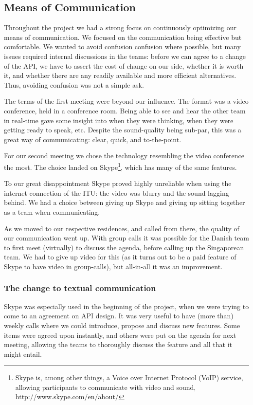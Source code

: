 \subsection{Means of Communication}

Throughout the project we had a strong focus on continuously optimizing our
means of communication. We focused on the communication being effective but
comfortable. We wanted to avoid confusion confusion where possible, but many
issues required internal discussions in the teams: before we can agree to a
change of the API, we have to assert the cost of change on our side, whether it
is worth it, and whether there are any readily available and more efficient
alternatives. Thus, avoiding confusion was not a simple ask.

The terms of the first meeting were beyond our influence. The format was a
video conference, held in a conference room. Being able to see and hear the
other team in real-time gave some insight into when they were thinking, when
they were getting ready to speak, etc. Despite the sound-quality being sub-par,
this was a great way of communicating: clear, quick, and to-the-point.

For our second meeting we chose the technology resembling the video conference
the most. The choice landed on Skype\footnote{ Skype is, among other things, a
Voice over Internet Protocol (VoIP) service, allowing participants to
communicate with video and sound, http://www.skype.com/en/about/}, which has
many of the same features.

To our great disappointment Skype proved highly unreliable when using the internet-connection of the ITU: the video was blurry
and the sound lagging behind. We had a choice between giving up Skype and giving up sitting together as a team when communicating.

As we moved to our respective residences, and called from there, the quality of our communication went up. With group calls it was
possible for the Danish team to first meet (virtually) to discuss the agenda, before calling up the Singaporean team. We had to give
up video for this (as it turns out to be a paid feature of Skype to have video in group-calls), but all-in-all it was an improvement.

\subsubsection{The change to textual communication}
Skype was especially used in the beginning of the project, when we were trying to come to an agreement on API design. It was very
useful to have (more than) weekly calls where we could introduce, propose and discuss new features. Some items were agreed upon instantly,
and others were put on the agenda for next meeting, allowing the teams to thoroughly discuss the feature and all that it might entail.

